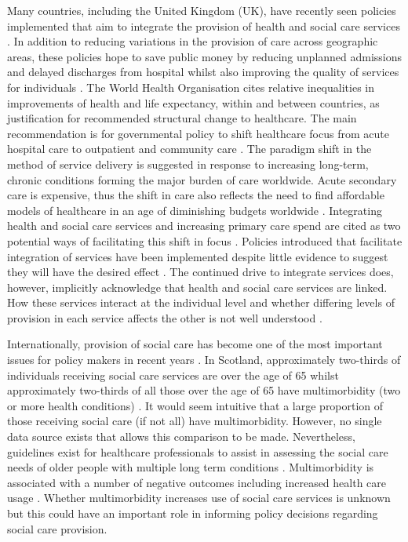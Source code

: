 \documentclass[12pt,]{report}
\begin{document}
Many countries, including the United Kingdom (UK), have recently seen
policies implemented that aim to integrate the provision of health and
social care services \citep{RN234, RN362, RN262}. In addition to
reducing variations in the provision of care across geographic areas,
these policies hope to save public money by reducing unplanned
admissions and delayed discharges from hospital whilst also improving
the quality of services for individuals \citep{RN232, RN266, RN406}. The
World Health Organisation \citeyearpar{RN320} cites relative
inequalities in improvements of health and life expectancy, within and
between countries, as justification for recommended structural change to
healthcare. The main recommendation is for governmental policy to shift
healthcare focus from acute hospital care to outpatient and community
care \citep{RN320}. The paradigm shift in the method of service delivery
is suggested in response to increasing long-term, chronic conditions
forming the major burden of care worldwide. Acute secondary care is
expensive, thus the shift in care also reflects the need to find
affordable models of healthcare in an age of diminishing budgets
worldwide \citep{RN320}. Integrating health and social care services and
increasing primary care spend are cited as two potential ways of
facilitating this shift in focus \citep{RN320}. Policies introduced that
facilitate integration of services have been implemented despite little
evidence to suggest they will have the desired effect
\citep{RN367, RN369, RN234, RN233, RN321, RN362, RN366, RN260}. The
continued drive to integrate services does, however, implicitly
acknowledge that health and social care services are linked. How these
services interact at the individual level and whether differing levels
of provision in each service affects the other is not well understood
\citep{RN361, RN205, RN406}.

Internationally, provision of social care has become one of the most
important issues for policy makers in recent years \citep{RN406, RN250}.
In Scotland, approximately two-thirds of individuals receiving social
care services are over the age of 65 \citep{RN128} whilst approximately
two-thirds of all those over the age of 65 have multimorbidity (two or
more health conditions) \citep{RN33}. It would seem intuitive that a
large proportion of those receiving social care (if not all) have
multimorbidity. However, no single data source exists that allows this
comparison to be made. Nevertheless, guidelines exist for healthcare
professionals to assist in assessing the social care needs of older
people with multiple long term conditions \citep{RN150}. Multimorbidity
is associated with a number of negative outcomes including increased
health care usage \citep{RN226}. Whether multimorbidity increases use of
social care services is unknown but this could have an important role in
informing policy decisions regarding social care provision.
\end{document}
